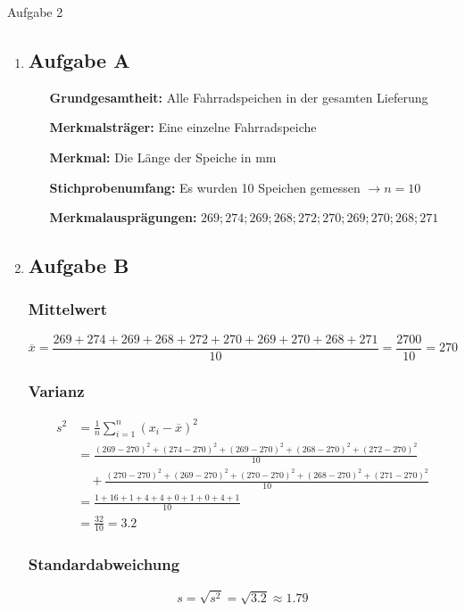 \documentclass[11pt,a4paper,oneside]{article}
\begin{document}
	\newpage
	
	\begin{loesung}{Aufgabe 2}
		\begin{enumerate}
			\item \subsection*{Aufgabe A}
			\begin{itemize}[left=4cm]
				\item[\textbf{Grundgesamtheit:}] Alle Fahrradspeichen in der gesamten Lieferung 
				\item[\textbf{Merkmalsträger:}] Eine einzelne Fahrradspeiche 
				\item[\textbf{Merkmal:}] Die Länge der Speiche in mm 
				\item[\textbf{Stichprobenumfang:}] Es wurden 10 Speichen gemessen $\rightarrow n = 10$ 
				\item[\textbf{Merkmalausprägungen:}] ${269; 274; 269; 268; 272; 270; 269; 270; 268; 271}$
			\end{itemize}
			
			\item \subsection*{Aufgabe B}
			
			\subsubsection*{Mittelwert}
			\vspace{-4mm}
			\[
			\overline{x} = \frac{269 + 274 + 269 + 268 + 272 + 270 + 269 + 270 + 268 + 271}{10} 
			= \boxed{\frac{2700}{10} = 270}
			\]
			
			\subsubsection*{Varianz}
			\vspace{-6mm}
			\begin{align*}
				s^2 &= \frac{1}{n} \sum^{n}_{i = 1} (x_i - \overline{x})^2 \\[2mm]
				&= \frac{(269-270)^2 + (274-270)^2 + (269-270)^2 + (268-270)^2 + (272-270)^2}{10} \\
				&\quad + \frac{(270-270)^2 + (269-270)^2 + (270-270)^2 + (268-270)^2 + (271-270)^2}{10} \\[2mm]
				&= \frac{1 + 16 + 1 + 4 + 4 + 0 + 1 + 0 + 4 + 1}{10} \\[2mm]
				&= \boxed{\frac{32}{10} = 3.2}
			\end{align*}
			
			\subsubsection*{Standardabweichung}
			\[
			s = \sqrt{s^2} = \sqrt{3.2} \approx \boxed{1.79}
			\]
			
		\end{enumerate}
	\end{loesung}
	
\end{document}
